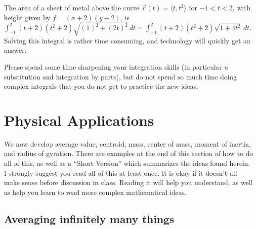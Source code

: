 \begin{example}
%
The area of a sheet of metal above the curve $\vec
r(t)=\langle t,t^2\rangle$ for $-1<t<2$, with height given by
{$f=(x+2)(y+2)$}, is 
$\int_{-1}^{2}(t+2)(t^2+2)\sqrt{(1)^2+(2t)^2}\,dt 
= \int_{-1}^{2} (t+2)(t^2+2)\sqrt{1+4t^2}\,dt$. Solving this integral is
rather time consuming, and technology will quickly get an answer.
\end{example}


Please spend some time sharpening your integration skills (in
particular $u$ substitution and integration by parts), but do not
spend so much time doing complex integrals that you do not get to
practice the new ideas.


\section{Physical Applications}
We now develop average value, centroid, mass, center of mass, moment
of inertia, and radius of gyration. There are examples at the end of
this section of how to do all of this, as well as a ``Short Version''
which summarizes the ideas found herein. I strongly suggest you read
all of this at least once. It is okay if it doesn't all make sense
before discussion in class.  Reading it will help you understand, as
well as help you learn to read more complex mathematical ideas. 

\subsection{Averaging infinitely many things}

